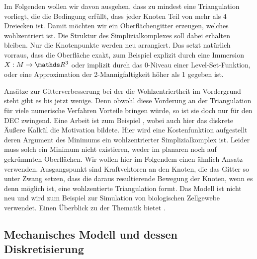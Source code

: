 \begin{ziel}
    Im Folgenden wollen wir davon ausgehen, dass zu mindest eine Triangulation vorliegt, die die Bedingung erfüllt, dass jeder Knoten Teil von mehr als 4 Dreiecken ist. 
    Damit möchten wir ein Oberflächengitter erzeugen, welches wohlzentriert ist.
    Die Struktur des Simplizialkomplexes soll dabei erhalten bleiben. Nur die Knotenpunkte werden neu arrangiert. Das setzt natürlich vorraus, dass die Oberfläche exakt, 
    zum Beispiel explizit durch eine Immersion \( X: M \rightarrow \R^{3} \) oder implizit durch das 0-Niveau einer Level-Set-Funktion\cite{levelset}, oder eine Approximation der 2-Mannigfaltigkeit höher als 1 gegeben ist.

    Ansätze zur Gitterverbesserung bei der die Wohlzentriertheit im Vordergrund steht gibt es bis jetzt wenige.
    Denn obwohl diese Vorderung an der Triangulation für viele numerische Verfahren Vorteile bringen würde, so ist sie doch nur für den DEC zwingend. 
    Eine Arbeit ist zum Beispiel \cite{meshHirani}, wobei auch hier das diskrete Äußere Kalkül die Motivation bildete.
    Hier wird eine Kostenfunktion aufgestellt deren Argument des Minimums ein wohlzentrierter Simplizialkomplex ist.
    Leider muss solch ein Minimum nicht existieren, weder im planaren noch auf gekrümmten Oberflächen.
    Wir wollen hier im Folgendem einen ähnlich Ansatz verwenden. 
    Ausgangspunkt sind Kraftvektoren an den Knoten, die das Gitter so unter Zwang setzen, dass die daraus resultierende Bewegung der Knoten, wenn es denn möglich ist, eine wohlzentierte Triangulation formt. 
    Das Modell ist nicht neu und wird zum Beispiel zur Simulation von biologischen Zellgewebe verwendet. 
    Einen Überblick zu der Thematik bietet \cite{meshCooper}.  
  \end{ziel}

  
  
  \subsection{Mechanisches Modell und dessen Diskretisierung}
    
